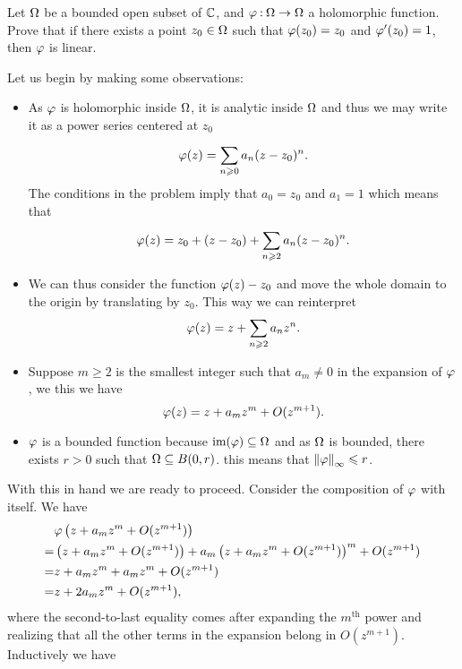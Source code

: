 \documentclass[12pt]{memoir}
\begin{document}
\begin{Ej}
    Let $\Omega$ be a bounded open subset of $\mathbb{C}$, and $\varphi\mathbin{:}\Omega\to\Omega$ a holomorphic function. Prove that if there exists a point $z_0\in\Omega$ such that $\varphi(z_0)=z_0$ and $\varphi'(z_0)=1$,
    then $\varphi$ is linear.
\end{Ej}

\begin{ptcbr}
   Let us begin by making some observations:
   \begin{itemize}
    \itemsep=-0.4em
    \item As $\varphi$ is holomorphic inside $\Omega$, it is analytic inside $\Omega$ and thus we may write it as a power series centered at $z_0$
    $$\varphi(z)=\sum_{n\geqslant 0}^{}a_n(z-z_0)^n.$$
    The conditions in the problem imply that $a_0=z_0$ and $a_1=1$ which means that 
    $$\varphi(z)=z_0+(z-z_0)+\sum_{n\geqslant 2}^{}a_n(z-z_0)^n.$$
    \item We can thus consider the function $\varphi(z)-z_0$ and move the whole domain to the origin by translating by $z_0$. This way we can reinterpret 
    $$\varphi(z)=z+\sum_{n\geqslant 2}a_nz^n.$$
    \item Suppose $m\geq 2$ is the smallest integer such that $a_m\neq 0$ in the expansion of $\varphi$, we this we have  
    $$\varphi(z)=z+a_mz^m+O(z^{m+1}).$$
    \item $\varphi$ is a bounded function because $\text{im}(\varphi)\subseteq\Omega$ and as $\Omega$ is bounded, there exists $r>0$ such that $\Omega\subseteq B(0,r)$. this means that $\norm{\varphi}_{\infty}\leqslant r$. 
   \end{itemize}
   With this in hand we are ready to proceed. Consider the composition of $\varphi$ with itself. We have 
   \begin{align*}
   &\varphi\left(z+a_mz^{m}+O(z^{m+1})\right)\\
   =&\left(z+a_mz^{m}+O(z^{m+1})\right)+a_m\left(z+a_mz^{m}+O(z^{m+1})\right)^m+O(z^{m+1})\\
   =&z+a_mz^m+a_mz^m+O(z^{m+1})\\
   =&z+2a_mz^m+O(z^{m+1}),
   \end{align*}
   where the second-to-last equality comes after expanding the $m^{\text{th}}$ power and realizing that all the other terms in the expansion belong in $O(z^{m+1})$. Inductively we have 

\end{ptcbr}
\end{document}
